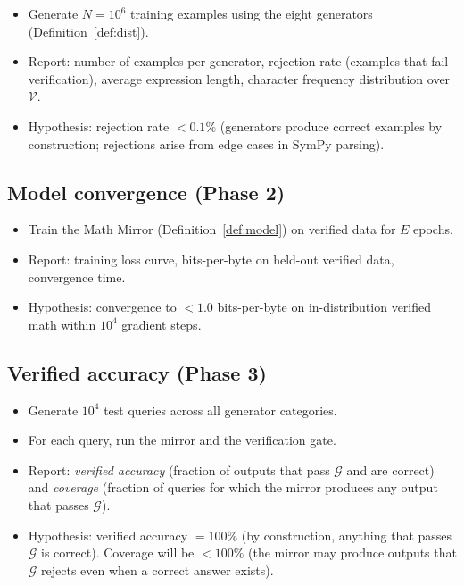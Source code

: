 \documentclass[11pt,a4paper]{article}
\newcommand{\cV}{\mathcal{V}}
\newcommand{\cG}{\mathcal{G}}
\begin{document}
\begin{itemize}[nosep]
\item Generate $N = 10^6$ training examples using the eight
  generators (Definition~\ref{def:dist}).
\item Report: number of examples per generator, rejection rate
  (examples that fail verification), average expression length,
  character frequency distribution over $\cV$.
\item Hypothesis: rejection rate $< 0.1\%$ (generators produce
  correct examples by construction; rejections arise from
  edge cases in SymPy parsing).
\end{itemize}

\subsection{Model convergence (Phase 2)}

\begin{itemize}[nosep]
\item Train the Math Mirror (Definition~\ref{def:model})
  on verified data for $E$ epochs.
\item Report: training loss curve, bits-per-byte on held-out
  verified data, convergence time.
\item Hypothesis: convergence to $< 1.0$ bits-per-byte on
  in-distribution verified math within $10^4$ gradient steps.
\end{itemize}

\subsection{Verified accuracy (Phase 3)}

\begin{itemize}[nosep]
\item Generate $10^4$ test queries across all generator categories.
\item For each query, run the mirror and the verification gate.
\item Report: \emph{verified accuracy} (fraction of outputs that
  pass $\cG$ and are correct) and \emph{coverage}
  (fraction of queries for which the mirror produces any output
  that passes $\cG$).
\item Hypothesis: verified accuracy $= 100\%$ (by construction,
  anything that passes $\cG$ is correct).
  Coverage will be $< 100\%$ (the mirror may produce outputs
  that $\cG$ rejects even when a correct answer exists).
\end{itemize}
\end{document}
